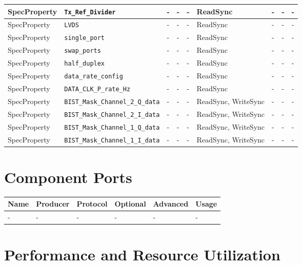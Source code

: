 \documentclass{article}
\begin{document}
\begin{landscape}
\begin{scriptsize}
\begin{longtable}{|p{2cm}|p{4cm}|p{1cm}|p{2cm}|p{2cm}|p{2cm}|p{2cm}|p{1cm}|p{4.58cm}|}
			\hline
			SpecProperty & \verb+Tx_Ref_Divider+ & - & - & - & ReadSync  & - & - & - \\
			\hline
			SpecProperty & \verb+LVDS+ & - & - & - & ReadSync & - & - & - \\
			\hline
			SpecProperty & \verb+single_port+ & - & - & - & ReadSync & - & - & - \\
			\hline
			SpecProperty & \verb+swap_ports+ & - & - & - & ReadSync & - & - & - \\
			\hline
			SpecProperty & \verb+half_duplex+ & - & - & - & ReadSync & - & - & - \\
			\hline
			SpecProperty & \verb+data_rate_config+ & - & - & - & ReadSync & - & - & - \\
			\hline
			SpecProperty & \verb+DATA_CLK_P_rate_Hz+ & - & - & - & ReadSync  & - & - & - \\
			\hline
			SpecProperty & \verb+BIST_Mask_Channel_2_Q_data+ & - & - & - & ReadSync, WriteSync & - & - & - \\
			\hline
			SpecProperty & \verb+BIST_Mask_Channel_2_I_data+ & - & - & - & ReadSync, WriteSync & - & - & - \\
			\hline
			SpecProperty & \verb+BIST_Mask_Channel_1_Q_data+ & - & - & - & ReadSync, WriteSync & - & - & - \\
			\hline
			SpecProperty & \verb+BIST_Mask_Channel_1_I_data+ & - & - & - & ReadSync, WriteSync & - & - & - \\
			\hline
		\end{longtable}
	\end{scriptsize}
\pagebreak
	\section*{Component Ports}
	\begin{scriptsize}
		\begin{tabular}{|p{2cm}|p{1.5cm}|p{4cm}|p{1.5cm}|p{1.5cm}|p{9.38cm}|}
			\hline
			\rowcolor{blue}
			Name & Producer & Protocol           & Optional & Advanced & Usage                  \\
			\hline
			-  & -     & - & -     & -        & - \\
			\hline
		\end{tabular}
	\end{scriptsize}
\end{landscape}

\section*{Performance and Resource Utilization}
\end{document}
